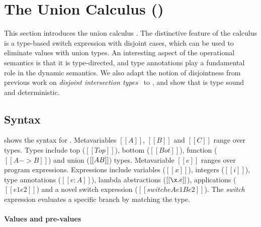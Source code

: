 \section{The Union Calculus (\name)}
\label{sec:union}

This section introduces the union calculus \name. The distinctive feature
of the \name calculus is a type-based switch expression with disjoint
cases, which can be used to eliminate values with union types.
An interesting aspect of the operational
semantics is that it is type-directed,
and type annotations
play a fundamental role in the dynamic semantics.
We also adapt the notion of disjointness from previous work on
\emph{disjoint intersection types}~\cite{oliveira2016disjoint} to \name, and show that \name is type
sound and deterministic.


\subsection{Syntax}\label{sec:union:syntax}
 shows the syntax for \cal. Metavariables
$[[A]]$, $[[B]]$ and $[[C]]$ range over types.  Types include top ($[[Top]]$),
bottom ($[[Bot]]$), function ($[[A -> B]]$) and union ($[[A \/ B]]$)
types. Metavariable $[[e]]$ ranges over program
expressions. Expressions include variables ($[[x]]$), integers
($[[i]]$), type annotations ($[[e:A]]$), lambda abstractions
($[[\x.e]]$), applications ($[[e1 e2]]$) and a novel switch expression ($[[switch
    e A e1 B e2]]$). The \emph{switch} expression evaluates a specific branch by matching the
type.

\paragraph{Values and pre-values}

